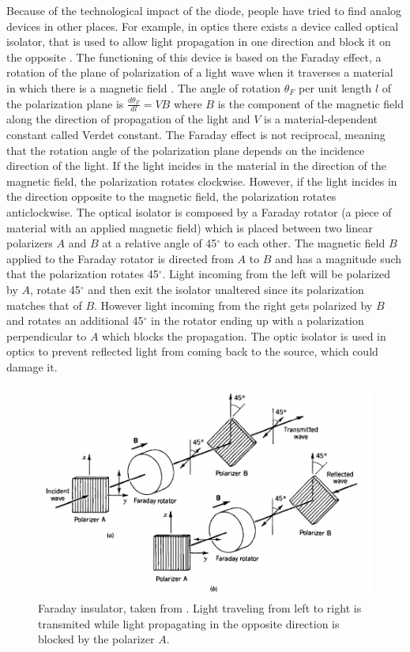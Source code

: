 Because of the technological impact of the diode, people have tried to find analog devices in other places. For example, in optics there exists a device called optical isolator, that is used to allow light propagation in one direction and block it on the opposite \cite{Saleh1991}. The functioning of this device is based on the Faraday effect, a rotation of the plane of polarization of a light wave when it traverses a material in which there is a magnetic field \cite{Yariv1984}. The angle of rotation $\theta_F$ per unit length $l$ of the polarization plane is $\frac{d\theta_F}{dl} = V B$ where $B$ is the component of the magnetic field along the direction of propagation of the light and $V$ is a material-dependent constant called Verdet constant. The Faraday effect is not reciprocal, meaning that the rotation angle of the polarization plane depends on the incidence direction of the light. If the light incides in the material in the direction of the magnetic field, the polarization rotates clockwise. However, if the light incides in the direction opposite to the magnetic field, the polarization rotates anticlockwise. The optical isolator is composed by a Faraday rotator (a piece of material with an applied magnetic field) which is placed between two linear polarizers $A$ and $B$ at a relative angle of 45$^\circ$ to each other. The magnetic field $B$ applied to the Faraday rotator is directed from $A$ to $B$ and has a magnitude such that the polarization rotates 45$^\circ$. Light incoming from the left will be polarized by $A$, rotate 45$^\circ$ and then exit the isolator unaltered since its polarization matches that of $B$. However light incoming from the right gets polarized by $B$ and rotates an additional 45$^\circ$ in the rotator ending up with a polarization perpendicular to $A$ which blocks the propagation. The optic isolator is used in optics to prevent reflected light from coming back to the source, which could damage it.

\begin{figure}
  \includegraphics[width = 0.9\columnwidth]{Figures/Faraday-Insulator.png}
  \caption{Faraday insulator, taken from \cite{Saleh1991}. Light traveling from left to right is transmited while light propagating in the opposite direction is blocked by the polarizer $A$.}
  \label{fig:Faraday-insulator}
\end{figure}

